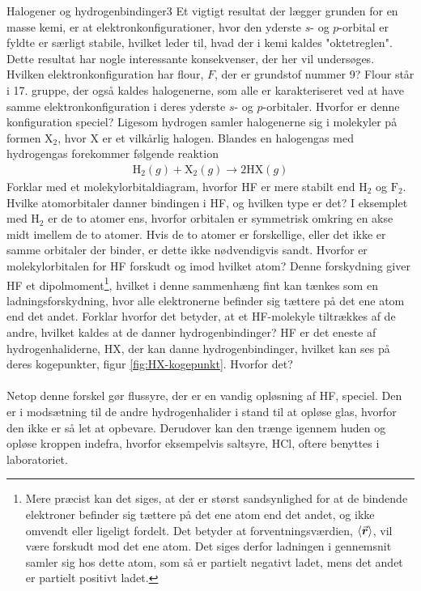 \begin{opgave}{Halogener og hydrogenbindinger}{3}
Et vigtigt resultat der lægger grunden for en masse kemi, er at elektronkonfigurationer, hvor den yderste $s$- og $p$-orbital er fyldte er særligt stabile, hvilket leder til, hvad der i kemi kaldes "oktetreglen". Dette resultat har nogle interessante konsekvenser, der her vil undersøges.
\opg Hvilken elektronkonfiguration har flour, $F$, der er grundstof nummer 9?
\opg Flour står i 17. gruppe, der også kaldes halogenerne, som alle er karakteriseret ved at have samme elektronkonfiguration i deres yderste $s$- og $p$-orbitaler. Hvorfor er denne konfiguration speciel?
\opg Ligesom hydrogen samler halogenerne sig i molekyler på formen $\mathrm{X}_2$, hvor X er et vilkårlig halogen. Blandes en halogengas med hydrogengas forekommer følgende reaktion
\begin{align*}
	\mathrm{H}_2(g) + \mathrm{X}_2(g) \rightarrow 2 \mathrm{HX}(g)
\end{align*}
Forklar med et molekylorbitaldiagram, hvorfor HF er mere stabilt end $\mathrm{H}_2$ og $\mathrm{F}_2$.
\opg Hvilke atomorbitaler danner bindingen i HF, og hvilken type er det?
\opg I eksemplet med $\mathrm{H}_2$ er de to atomer ens, hvorfor orbitalen er symmetrisk omkring en akse midt imellem de to atomer. Hvis de to atomer er forskellige, eller det ikke er samme orbitaler der binder, er dette ikke nødvendigvis sandt. Hvorfor er molekylorbitalen for HF forskudt og imod hvilket atom?
\opg Denne forskydning giver HF et dipolmoment\footnote{Mere præcist kan det siges, at der er størst sandsynlighed for at de bindende elektroner befinder sig tættere på det ene atom end det andet, og ikke omvendt eller ligeligt fordelt. Det betyder at forventningsværdien, $\left< {\vec{\boldsymbol{r}}} \right>$, vil være forskudt mod det ene atom. Det siges derfor ladningen i gennemsnit samler sig hos dette atom, som så er partielt negativt ladet, mens det andet er partielt positivt ladet.}, hvilket i denne sammenhæng fint kan tænkes som en ladningsforskydning, hvor alle elektronerne befinder sig tættere på det ene atom end det andet. Forklar hvorfor det betyder, at et HF-molekyle tiltrækkes af de andre, hvilket kaldes at de danner hydrogenbindinger?
\opg HF er det eneste af hydrogenhaliderne, HX, der kan danne hydrogenbindinger, hvilket kan ses på deres kogepunkter, figur \ref{fig:HX-kogepunkt}. Hvorfor det? \\ \\
Netop denne forskel gør flussyre, der er en vandig opløsning af HF, speciel. Den er i modsætning til de andre hydrogenhalider i stand til at opløse glas, hvorfor den ikke er så let at opbevare. Derudover kan den trænge igennem huden og opløse kroppen indefra, hvorfor eksempelvis saltsyre, HCl, oftere benyttes i laboratoriet.
\end{opgave}